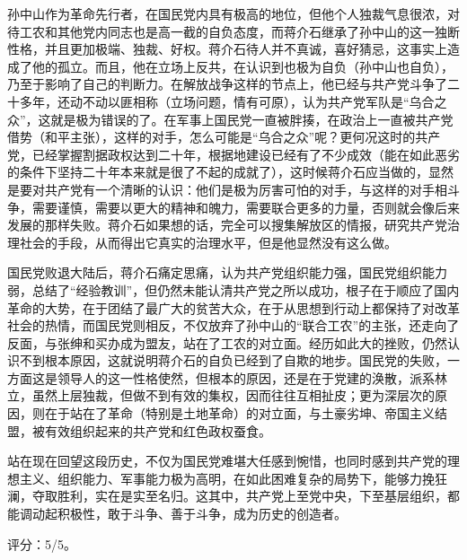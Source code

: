 孙中山作为革命先行者，在国民党内具有极高的地位，但他个人独裁气息很浓，对待工农和其他党内同志也是高一截的自负态度，而蒋介石继承了孙中山的这一独断性格，并且更加极端、独裁、好权。蒋介石待人并不真诚，喜好猜忌，这事实上造成了他的孤立。而且，他在立场上反共，在认识到也极为自负（孙中山也自负），乃至于影响了自己的判断力。在解放战争这样的节点上，他已经与共产党斗争了二十多年，还动不动以匪相称（立场问题，情有可原），认为共产党军队是“乌合之众”，这就是极为错误的了。在军事上国民党一直被胖揍，在政治上一直被共产党借势（和平主张），这样的对手，怎么可能是“乌合之众”呢？更何况这时的共产党，已经掌握割据政权达到二十年，根据地建设已经有了不少成效（能在如此恶劣的条件下坚持二十年本来就是很了不起的成就了），这时候蒋介石应当做的，显然是要对共产党有一个清晰的认识：他们是极为厉害可怕的对手，与这样的对手相斗争，需要谨慎，需要以更大的精神和魄力，需要联合更多的力量，否则就会像后来发展的那样失败。蒋介石如果想的话，完全可以搜集解放区的情报，研究共产党治理社会的手段，从而得出它真实的治理水平，但是他显然没有这么做。

国民党败退大陆后，蒋介石痛定思痛，认为共产党组织能力强，国民党组织能力弱，总结了“经验教训”，但仍然未能认清共产党之所以成功，根子在于顺应了国内革命的大势，在于团结了最广大的贫苦大众，在于从思想到行动上都保持了对改革社会的热情，而国民党则相反，不仅放弃了孙中山的“联合工农”的主张，还走向了反面，与张绅和买办成为盟友，站在了工农的对立面。经历如此大的挫败，仍然认识不到根本原因，这就说明蒋介石的自负已经到了自欺的地步。国民党的失败，一方面这是领导人的这一性格使然，但根本的原因，还是在于党建的涣散，派系林立，虽然上层独裁，但做不到有效的集权，因而往往互相扯皮；更为深层次的原因，则在于站在了革命（特别是土地革命）的对立面，与土豪劣坤、帝国主义结盟，被有效组织起来的共产党和红色政权蚕食。

站在现在回望这段历史，不仅为国民党难堪大任感到惋惜，也同时感到共产党的理想主义、组织能力、军事能力极为高明，在如此困难复杂的局势下，能够力挽狂澜，夺取胜利，实在是实至名归。这其中，共产党上至党中央，下至基层组织，都能调动起积极性，敢于斗争、善于斗争，成为历史的创造者。

评分：5/5。